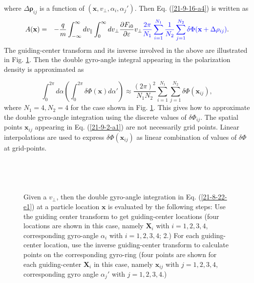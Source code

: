 \documentclass{llncs}
\newcommand{\tmcolor}[2]{{\color{#1}{#2}}}
\begin{document}
where $\Delta \mathbf{\rho}_{i j}$ is a function of $(\mathbf{x}, v_{\perp},
\alpha_i, \alpha_j')$. Then Eq. (\ref{21-9-16-a4}) is written as
\begin{eqnarray}
  A (\mathbf{x}) & = & - \frac{q}{m}  \int_{- \infty}^{\infty} d v_{\parallel}
  \int_0^{\infty} d v_{\perp} \frac{\partial F_{i 0}}{\partial \varepsilon}
  v_{\perp} \tmcolor{blue}{\frac{2 \pi}{N_1} \sum_{i = 1}^{N_1} \frac{1}{N_2} 
  \sum_{j = 1}^{N_2} \delta \Phi (\mathbf{x} + \Delta \mathbf{\rho}_{i j})} . 
  \label{22-11-8-1}
\end{eqnarray}
The guiding-center transform and its inverse involved in the above are
illustrated in Fig. \ref{21-8-22-a1}. Then the double gyro-angle integral
appearing in the polarization density is approximated as


\begin{equation}
  \label{21-9-2-a1} \int_0^{2 \pi} d \alpha \left( \int_0^{2 \pi} \delta \Phi
  (\mathbf{x}) d \alpha' \right) \approx \frac{(2 \pi)^2}{N_1 N_2}  \sum_{i =
  1}^{N_1} \sum_{j = 1}^{N_2} \delta \Phi (\mathbf{x}_{i j}),
\end{equation}
where $N_1 = 4, N_2 = 4$ for the case shown in Fig. \ref{21-8-22-a1}. This
gives how to approximate the double gyro-angle integration using the discrete
values of $\delta \Phi_{i j}$. The spatial points $\mathbf{x}_{i j}$ appearing
in Eq. (\ref{21-9-2-a1}) are not necessarily grid points. Linear
interpolations are used to express $\delta \Phi (\mathbf{x}_{i j})$ as linear
combination of values of $\delta \Phi$ at grid-points.

\

\

\begin{figure}[h]
  \caption{\label{21-8-22-a1}Given a $v_{\perp}$, then the double gyro-angle
  integration in Eq. (\ref{21-8-22-e1}) at a particle location $\mathbf{x}$ is
  evaluated by the following steps: Use the guiding center transform to get
  guiding-center locations (four locations are shown in this case, namely
  $\mathbf{X}_i$ with $i = 1, 2, 3, 4$, corresponding gyro-angle $\alpha_i$
  with $i = 1, 2, 3, 4$; 2.) For each guiding-center location, use the inverse
  guiding-center transform to calculate points on the corresponding gyro-ring
  (four points are shown for each guiding-center $\mathbf{X}_i$ in this case,
  namely $\mathbf{x}_{i j}$ with $j = 1, 2, 3, 4$, corresponding gyro angle
  $\alpha_j'$ with $j = 1, 2, 3, 4$.)}
\end{figure}
\end{document}

